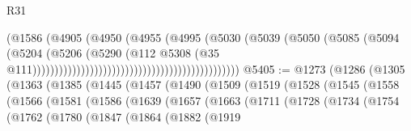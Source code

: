 \begin{lexlean}{R31}
\begin{coremodule}
                                                                    (@1586
                                                                      (@4905
                                                                        (@4950
                                                                          (@4955
                                                                            (@4995
                                                                              (@5030
                                                                                (@5039
                                                                                  (@5050
                                                                                    (@5085
                                                                                      (@5094
                                                                                        (@5204
                                                                                          (@5206
                                                                                            (@5290
                                                                                              (@112
                                                                                                @5308
                                                                                                (@35
                                                                                                  @111)))))))))))))))))))))))))))))))))))))))))))))))
@5405 := @1273
    (@1286
      (@1305
        (@1363
          (@1385
            (@1445
              (@1457
                (@1490
                  (@1509
                    (@1519
                      (@1528
                        (@1545
                          (@1558
                            (@1566
                              (@1581
                                (@1586
                                  (@1639
                                    (@1657
                                      (@1663
                                        (@1711
                                          (@1728
                                            (@1734
                                              (@1754
                                                (@1762
                                                  (@1780
                                                    (@1847
                                                      (@1864
                                                        (@1882
                                                          (@1919

\end{coremodule}
\end{lexlean}
